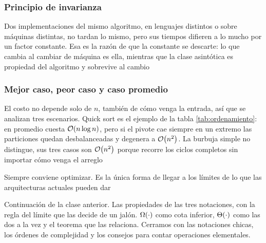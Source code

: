 \documentclass[11pt,letterpaper]{article}
\begin{document}
\subsubsection*{Principio de invarianza}

Dos implementaciones del mismo algoritmo, en lenguajes distintos o
sobre máquinas distintas, no tardan lo mismo, pero sus tiempos
difieren a lo mucho por un factor constante. Esa es la razón de que
la constante se descarte: lo que cambia al cambiar de máquina es
ella, mientras que la clase asintótica es propiedad del algoritmo y
sobrevive al cambio

\subsubsection*{Mejor caso, peor caso y caso promedio}

El costo no depende solo de $n$, también de cómo venga la entrada,
así que se analizan tres escenarios. Quick sort es el ejemplo de la
tabla \ref{tab:ordenamiento}: en promedio cuesta $\mathcal{O}\!\left(n \log n\right)$,
pero si el pivote cae siempre en un extremo las particiones quedan
desbalanceadas y degenera a $\mathcal{O}\!\left(n^2\right)$. La burbuja simple no
distingue, sus tres casos son $\mathcal{O}\!\left(n^2\right)$ porque recorre los ciclos
completos sin importar cómo venga el arreglo

\begin{idea}
  Siempre conviene optimizar. Es la única forma de llegar a los
  límites de lo que las arquitecturas actuales pueden dar
\end{idea}

\vspace{2em}




\newpage



\begin{quick_sum}
    Continuación de la clase anterior. Las propiedades de las tres
    notaciones, con la regla del límite que las decide de un jalón.
    $\Omega\!\left(\cdot\right)$ como cota inferior, $\Theta\!\left(\cdot\right)$ como las dos a la
    vez y el teorema que las relaciona. Cerramos con las notaciones
    chicas, los órdenes de complejidad y los consejos para contar
    operaciones elementales.
\end{quick_sum}
\end{document}
